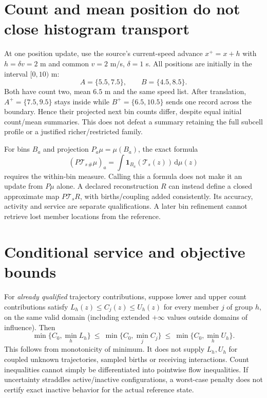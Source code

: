 \documentclass[11pt]{article}
\newcommand{\dd}{\mathrm{d}}
\newcommand{\CM}{\mathcal{T}}
\begin{document}
\section{Count and mean position do not close histogram transport}
At one position update, use the source's current-speed advance $x^+=x+h$ with
$h=\delta v=2$ m and common $v=2$ m/s, $\delta=1$ s. All positions are initially
in the interval $[0,10)$ m:
\begin{equation}
 A=\{5.5,7.5\},\qquad B=\{4.5,8.5\}. \label{eq:positions}
\end{equation}
Both have count two, mean $6.5$ m and the same speed list. After translation,
$A^+=\{7.5,9.5\}$ stays inside while $B^+=\{6.5,10.5\}$ sends one record across
the boundary. Hence their projected next bin counts differ, despite equal
initial count/mean summaries. This does not defeat a summary retaining the
full subcell profile or a justified richer/restricted family.

For bins $B_a$ and projection $P_a\mu=\mu(B_a)$, the exact formula
\begin{equation}
 (P\CM_{s\,\#}\mu)_a=\int\mathbf{1}_{B_a}(\CM_s(z))\,\dd\mu(z)
 \label{eq:binupdate}
\end{equation}
requires the within-bin measure. Calling this a formula does not make it an
update from $P\mu$ alone. A declared reconstruction $R$ can instead define a
closed approximate map $P\CM_sR$, with births/coupling added consistently.
Its accuracy, activity and service are separate qualifications. A later bin
refinement cannot retrieve lost member locations from the reference.

\section{Conditional service and objective bounds}
For \emph{already qualified} trajectory contributions, suppose lower and upper
count contributions satisfy $L_h(z)\leq C_j(z)\leq U_h(z)$ for every member
$j$ of group $h$, on the same valid domain (including extended $+\infty$ values
outside domains of influence). Then
\begin{equation}
 \min\{C_0,\min_h L_h\}\ \leq\
 \min\{C_0,\min_j C_j\}\ \leq\
 \min\{C_0,\min_h U_h\}. \label{eq:envelope}
\end{equation}
This follows from monotonicity of minimum. It does not supply $L_h,U_h$ for
coupled unknown trajectories, sampled births or receiving interactions. Count
inequalities cannot simply be differentiated into pointwise flow inequalities.
If uncertainty straddles active/inactive configurations, a worst-case penalty
does not certify exact inactive behavior for the actual reference state.
\end{document}
